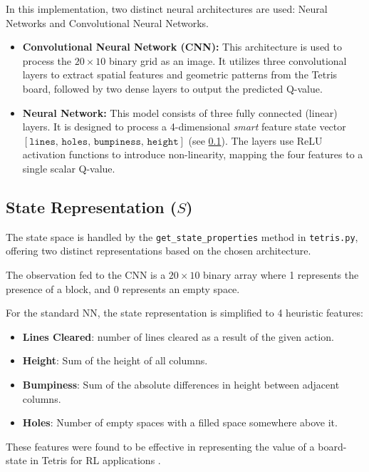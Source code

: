 \documentclass[12pt]{article}
\begin{document}
In this implementation, two distinct neural architectures are used: Neural Networks and Convolutional Neural Networks.

\begin{itemize}
    \item \textbf{Convolutional Neural Network (CNN):} This architecture is used to process the $20 \times 10$ binary grid as an image. It utilizes three convolutional layers to extract spatial features and geometric patterns from the Tetris board, followed by two dense layers to output the predicted Q-value. 
    
    \item \textbf{Neural Network:} This model consists of three fully connected (linear) layers. It is designed to process a 4-dimensional \textit{smart} feature state vector $[\texttt{lines, holes, bumpiness, height}]$ (see \ref{states}). The layers use ReLU activation functions to introduce non-linearity, mapping the four features to a single scalar Q-value.
    
\end{itemize}

\subsection{State Representation ($S$)} \label{states}

The state space is handled by the \texttt{get\_state\_properties} method in \texttt{tetris.py}, offering two distinct representations based on the chosen architecture.

The observation fed to the CNN is a $20 \times 10$ binary array where 1 represents the presence of a block, and 0 represents an empty space.

For the standard NN, the state representation is simplified to 4 heuristic features:
\begin{itemize}
    \item \textbf{Lines Cleared}: number of lines cleared as a result of the given action.
    \item \textbf{Height}: Sum of the height of all columns.
    \item \textbf{Bumpiness}: Sum of the absolute differences in height between adjacent columns.
    \item \textbf{Holes}: Number of empty spaces with a filled space somewhere above it.
\end{itemize}
These features were found to be effective in representing the value of a board-state in Tetris for RL applications \autocite{stevenspradhan2016tetris}.
\end{document}
